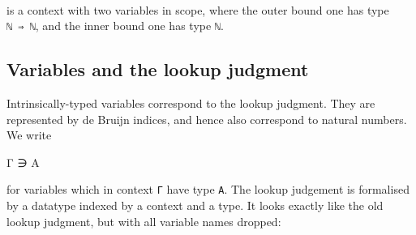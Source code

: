 \begin{fence}
\begin{code}%
\>[0]\AgdaFunction{\AgdaUnderscore{}}\AgdaSpace{}%
\AgdaSymbol{:}\AgdaSpace{}%
\<%
\\
\>[0]\AgdaSymbol{\AgdaUnderscore{}}\AgdaSpace{}%
\AgdaSymbol{=}\AgdaSpace{}%
\AgdaSpace{}%
\AgdaOperator{\AgdaInductiveConstructor{,}}\AgdaSpace{}%
\AgdaSpace{}%
\AgdaSpace{}%
\AgdaSpace{}%
\AgdaOperator{\AgdaInductiveConstructor{,}}\AgdaSpace{}%
\<%
\end{code}
\end{fence}

is a context with two variables in scope, where the outer bound one has
type \texttt{\textasciigrave{}ℕ\ ⇒\ \textasciigrave{}ℕ}, and the inner
bound one has type \texttt{\textasciigrave{}ℕ}.

\hypertarget{variables-and-the-lookup-judgment}{%
\subsection{Variables and the lookup
judgment}\label{variables-and-the-lookup-judgment}}

Intrinsically-typed variables correspond to the lookup judgment. They
are represented by de Bruijn indices, and hence also correspond to
natural numbers. We write

\begin{myDisplay}
Γ ∋ A
\end{myDisplay}

for variables which in context \texttt{Γ} have type \texttt{A}. The
lookup judgement is formalised by a datatype indexed by a context and a
type. It looks exactly like the old lookup judgment, but with all
variable names dropped:

